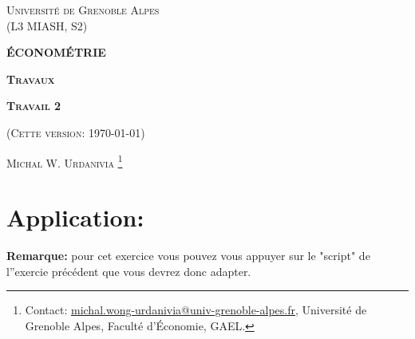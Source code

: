 \documentclass[10pt, reqno]{amsart}
\begin{document}
 
\usetikzlibrary{positioning}
\usetikzlibrary{snakes}
\usetikzlibrary{calc}
\usetikzlibrary{arrows}
\usetikzlibrary{decorations.markings}
\usetikzlibrary{shapes.misc}
\usetikzlibrary{shapes}

%

\begin{titlepage}
\centering
	{\scshape\Large \textsc{Université de Grenoble Alpes\\(L3 MIASH, S2)}\par}
	\vspace{0.5cm}
	{\Large\bfseries \scshape\Large \textsc{ÉCONOMÉTRIE}\par}
	\vspace{0.5cm}
	{\Large\bfseries \textsc{Travaux} \par}
    \vspace{0.5cm}   
   {\Large\bfseries \textsc{Travail 2} \par}
	\vspace{1cm}
	{(\textsc{Cette version: \today})\par}
	\vspace{1cm}
	{\large \textsc{Michal W. Urdanivia}
	\footnote{Contact:  
	\href{mailto:michal.wong-urdanivia@univ-grenoble-alpes.fr}{michal.wong-urdanivia@univ-grenoble-alpes.fr}, 
	 Université de Grenoble Alpes,  Faculté d'\'Economie, GAEL.}\par}
	
\end{titlepage}


\newpage

\tableofcontents

\newpage

\section{Application: \cite{KielMcCain1995}}
\textbf{Remarque:} pour cet exercice vous pouvez vous appuyer sur le "script" de l''exercie précédent que vous devrez donc adapter.
\end{document}
